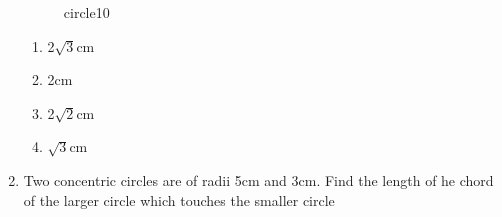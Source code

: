 \documentclass[10pt,a4paper]{article}
\begin{document}
\begin{enumerate}
\begin{figure}[!h]
			\caption{circle10}
			\label{fig=pic}
		\end{figure}
		\begin{enumerate}
			\item 2$\sqrt{3}$cm
			\item 2cm
			\item 2$\sqrt{2}$cm
			\item $\sqrt{3}$cm
		\end{enumerate}
	\item Two concentric circles are of radii 5cm and 3cm. Find the length of he chord of the larger circle 
		which touches the smaller circle






	
\end{enumerate}
\end{document}
